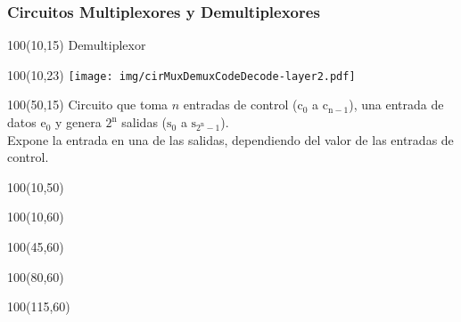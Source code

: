 \documentclass[aspectratio=169]{beamer}
\begin{document}
\begin{frame}[fragile]
    \frametitle{Circuitos Multiplexores y Demultiplexores}
    \begin{textblock}{100}(10,15) Demultiplexor \end{textblock}
    \begin{textblock}{100}(10,23) \texttt{[image: img/cirMuxDemuxCodeDecode-layer2.pdf]} \end{textblock}
    \begin{textblock}{100}(50,15)
    \small Circuito que toma $n$ entradas de control ($\mathrm{c_0}$ a $\mathrm{c_{n-1}}$), una entrada de datos $\mathrm{e_0}$ y genera $\mathrm{2^n}$ salidas ($\mathrm{s_0}$ a $\mathrm{s_{2^n-1}}$).\\
    \bigskip
    Expone la entrada en una de las salidas, dependiendo del valor de las entradas de control.
    \end{textblock}
    \begin{textblock}{100}(10,50)   \end{textblock}
    \begin{textblock}{100}(10,60)   \end{textblock}
    \begin{textblock}{100}(45,60)   \end{textblock}
    \begin{textblock}{100}(80,60)   \end{textblock}
    \begin{textblock}{100}(115,60)  \end{textblock}
\end{frame}
\end{document}
